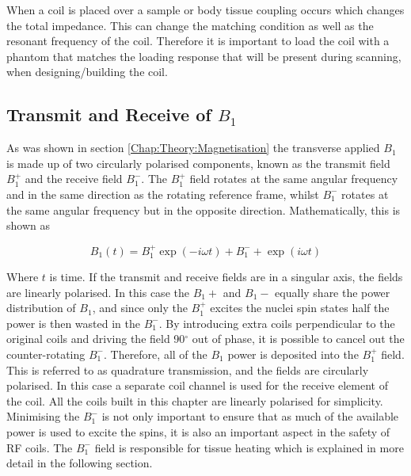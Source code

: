 When a coil is placed over a sample or body tissue coupling occurs which changes the total impedance. This can change the matching condition as well as the resonant frequency of the coil. Therefore it is important to load the coil with a phantom that matches the loading response that will be present during scanning, when designing/building the coil.

\subsection{Transmit and Receive of \texorpdfstring{$B_1$}{B1}}


As was shown in section \ref{Chap:Theory:Magnetisation} the transverse applied $B_1$ is made up of two circularly polarised components, known as the transmit field $B_1^+$ and the receive field $B_1^-$. The $B_1^+$ field rotates at the same angular frequency and in the same direction as the rotating reference frame, whilst $B_1^-$ rotates at the same angular frequency but in the opposite direction. Mathematically, this is shown as 

\begin{equation}
    B_1(t) = B_1^+\exp(-i\omega t) +B_1^-+\exp(i\omega t)
\end{equation}

Where $t$ is time. If the transmit and receive fields are in a singular axis, the fields are linearly polarised. In this case the $B_1+$ and $B_1-$ equally share the power distribution of $B_1$, and since only the $B_1^+$ excites the nuclei spin states half the power is then wasted in the $B_1^-$. By introducing extra coils perpendicular to the original coils and driving the field 90$^\circ$ out of phase, it is possible to cancel out the counter-rotating $B_1^-$. Therefore, all of the $B_1$ power is deposited into the $B_1^+$ field. This is referred to as quadrature transmission, and the fields are circularly polarised. In this case a separate coil channel is used for the receive element of the coil. All the coils built in this chapter are linearly polarised for simplicity. Minimising the $B_1^-$ is not only important to ensure that as much of the available power is used to excite the spins, it is also an important aspect in the safety of \ac{RF} coils. The $B_1^-$ field is responsible for tissue heating which is explained in more detail in the following section. 


